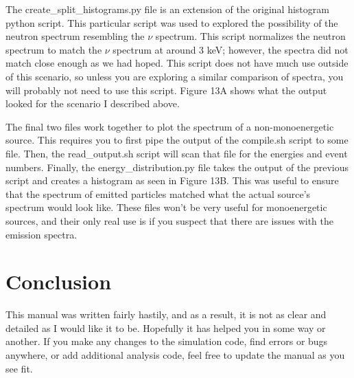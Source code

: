 \documentclass[%
12pt,
twoside,
reprint,
amsmath,amssymb,
aps,
]{article}
\begin{document}
	\par The create\_split\_histograms.py file is an extension of the original histogram python script. This particular script was used to explored the possibility of the neutron spectrum resembling the $\nu$ spectrum. This script normalizes the neutron spectrum to match the $\nu$ spectrum at around 3 keV; however, the spectra did not match close enough as we had hoped. This script does not have much use outside of this scenario, so unless you are exploring a similar comparison of spectra, you will probably not need to use this script. Figure 13A shows what the output looked for the scenario I described above.
	\par The final two files work together to plot the spectrum of a non-monoenergetic source. This requires you to first pipe the output of the compile.sh script to some file. Then, the read\_output.sh script will scan that file for the energies and event numbers. Finally, the energy\_distribution.py file takes the output of the previous script and creates a histogram as seen in Figure 13B. This was useful to ensure that the spectrum of emitted particles matched what the actual source's spectrum would look like. These files won't be very useful for monoenergetic sources, and their only real use is if you suspect that there are issues with the emission spectra.
	
	\section{Conclusion}
	\par This manual was written fairly hastily, and as a result, it is not as clear and detailed as I would like it to be. Hopefully it has helped you in some way or another. If you make any changes to the simulation code, find errors or bugs anywhere, or add additional analysis code, feel free to update the manual as you see fit.
\end{document}
